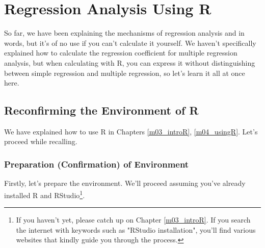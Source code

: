 \documentclass{ltjbook}
\begin{document}
\VerbatimFootnotes
\chapter{Regression Analysis Using R}
\label{m11_MRonR}

So far, we have been explaining the mechanisms of regression analysis and  in words, but it's of no use if you can't calculate it yourself. We haven't specifically explained how to calculate the regression coefficient for multiple regression analysis, but when calculating with R, you can express it without distinguishing between simple regression and multiple regression, so let's learn it all at once here.

\section{Reconfirming the Environment of R}
We have explained how to use R in Chapters \ref{m03_introR}, \ref{m04_usingR}. Let's proceed while recalling.

\subsection{Preparation (Confirmation) of Environment}
Firstly, let's prepare the environment. We'll proceed assuming you've already installed R and RStudio\footnote{If you haven't yet, please catch up on Chapter \ref{m03_introR}. If you search the internet with keywords such as "RStudio installation", you'll find various websites that kindly guide you through the process.}.
\end{document}
